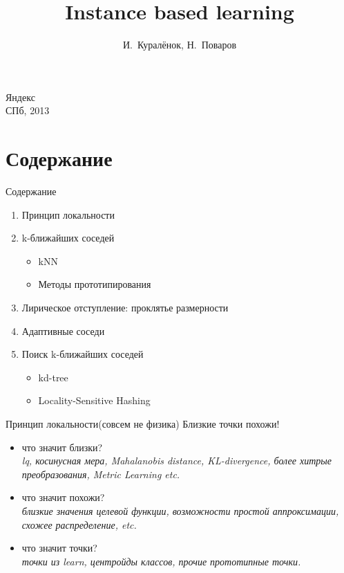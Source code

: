\documentclass[14pt, fleqn, xcolor={dvipsnames, table}]{beamer}
\title{Instance based learning\\\small{}}
\author[]{\small{%
И.~Куралёнок,
Н.~Поваров}}
\date{}
\begin{document}
\begin{frame}
\maketitle
\small
\begin{center}
\vspace{-60pt}
\normalsize {\color{red}Я}ндекс \\
\vspace{80pt}
\footnotesize СПб, 2013
\end{center}
\end{frame}

\section{Содержание}
\begin{frame}{Содержание}
\begin{enumerate}
  \item Принцип локальности
  \item k-ближайших соседей
  \begin{itemize}
    \item kNN
    \item Методы прототипирования
  \end{itemize}
  \item Лирическое отступление: проклятье размерности
  \item Адаптивные соседи
  \item Поиск k-ближайших соседей
  \begin{itemize}
    \item kd-tree
    \item Locality-Sensitive Hashing
  \end{itemize}
\end{enumerate}
\end{frame}

\begin{frame}{Принцип локальности(совсем не физика)}
  Близкие точки похожи!
  \begin{itemize}
    \item что значит близки? \\
    \emph{lq, косинусная мера, Mahalanobis distance, KL-divergence, более хитрые преобразования, Metric Learning etc.}
    \item что значит похожи? \\
    \emph{близкие значения целевой функции, возможности простой аппроксимации, схожее распределение, etc.}
    \item что значит точки? \\
    \emph{точки из learn, центройды классов, прочие прототипные точки.}
  \end{itemize}
\end{frame}
\end{document}
